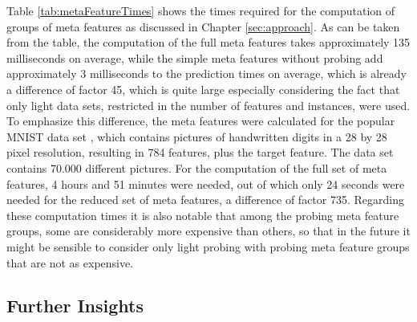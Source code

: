 Table \ref{tab:metaFeatureTimes} shows the times required for the computation of groups of meta features as discussed in Chapter \ref{sec:approach}. As can be taken from the table, the computation of the full meta features takes approximately 135 milliseconds on average, while the simple meta features without probing add approximately 3 milliseconds to the prediction times on average, which is already a difference of factor 45, which is quite large especially considering the fact that only light data sets, restricted in the number of features and instances, were used. To emphasize this difference, the meta features were calculated for the popular MNIST data set \cite{mnist}, which contains pictures of handwritten digits in a 28 by 28 pixel resolution, resulting in 784 features, plus the target feature. The data set contains 70.000 different pictures. For the computation of the full set of meta features, 4 hours and 51 minutes were needed, out of which only 24 seconds were needed for the reduced set of meta features, a difference of factor 735. Regarding these computation times it is also notable that among the probing meta feature groups, some are considerably more expensive than others, so that in the future it might be sensible to consider only light probing with probing meta feature groups that are not as expensive.



\subsection{Further Insights}

